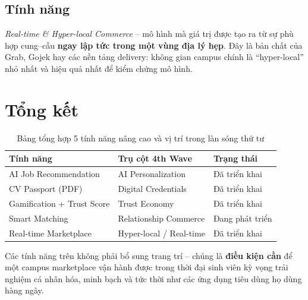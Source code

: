 \subsection*{Tính năng}

\textit{Real-time \& Hyper-local Commerce} -- mô hình mà giá trị được tạo ra từ sự phù
hợp cung--cầu \textbf{ngay lập tức trong một vùng địa lý hẹp}. Đây là bản chất của Grab,
Gojek hay các nền tảng delivery: không gian campus chính là ``hyper-local'' nhỏ nhất và
hiệu quả nhất để kiểm chứng mô hình.

\section*{Tổng kết}

\begin{table}[H]
\centering
\caption{Bảng tổng hợp 5 tính năng nâng cao và vị trí trong làn sóng thứ tư}
\renewcommand{\arraystretch}{1.2}
\begin{tabularx}{\textwidth}{|X|p{4cm}|p{3.5cm}|}
\hline
\textbf{Tính năng} & \textbf{Trụ cột 4th Wave} & \textbf{Trạng thái} \\
\hline
AI Job Recommendation  & AI Personalization      & Đã triển khai \\
\hline
CV Passport (PDF)      & Digital Credentials     & Đã triển khai \\
\hline
Gamification + Trust Score & Trust Economy      & Đã triển khai \\
\hline
Smart Matching         & Relationship Commerce   & Đang phát triển \\
\hline
Real-time Marketplace  & Hyper-local / Real-time & Đã triển khai \\
\hline

\end{tabularx}
\end{table}

Các tính năng trên không phải bổ sung trang trí -- chúng là \textbf{điều kiện cần} để một
campus marketplace vận hành được trong thời đại sinh viên kỳ vọng trải nghiệm cá nhân hóa,
minh bạch và tức thời như các ứng dụng tiêu dùng họ dùng hàng ngày.
